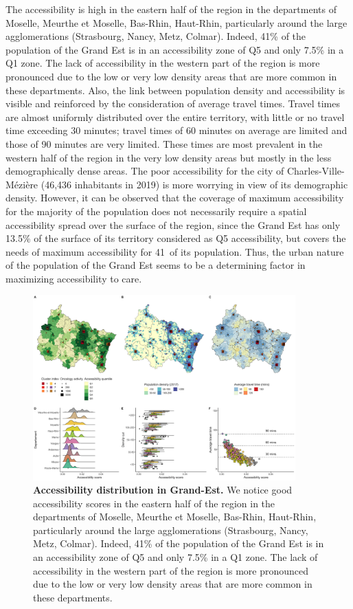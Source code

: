 The accessibility is high in the eastern half of the region in the departments
of Moselle, Meurthe et Moselle, Bas-Rhin, Haut-Rhin, particularly around the
large agglomerations (Strasbourg, Nancy, Metz, Colmar). Indeed, 41\% of the
population of the Grand Est is in an accessibility zone of Q5 and only 7.5\% in
a Q1 zone. The lack of accessibility in the western part of the region is more
pronounced due to the low or very low density areas that are more common in
these departments. Also, the link between population density and accessibility
is visible and reinforced by the consideration of average travel times. Travel
times are almost uniformly distributed over the entire territory, with little or
no travel time exceeding 30 minutes; travel times of 60 minutes on average are
limited and those of 90 minutes are very limited. These times are most prevalent
in the western half of the region in the very low density areas but mostly in
the less demographically dense areas.  The poor accessibility for the city of
Charles-Ville-Mézière (46,436 inhabitants in 2019) is more worrying in view of
its demographic density. However, it can be observed that the coverage of
maximum accessibility for the majority of the population does not necessarily
require a spatial accessibility spread over the surface of the region, since the
Grand Est has only 13.5\% of the surface of its territory considered as Q5
accessibility, but covers the needs of maximum accessibility for 41\ of its
population. Thus, the urban nature of the population of the Grand Est seems to
be a determining factor in maximizing accessibility to care.

\begin{figure}[H]
    \includegraphics[width=0.9\textwidth]{images/camion/region_accessibility/accessibility_Grand-Est.png}
    \centering
    \caption{ \textbf{Accessibility distribution in Grand-Est.} We notice good
        accessibility scores in the eastern half of the region in the
        departments of Moselle, Meurthe et Moselle, Bas-Rhin, Haut-Rhin,
        particularly around the large agglomerations (Strasbourg, Nancy, Metz,
        Colmar). Indeed, 41\% of the population of the Grand Est is in an
        accessibility zone of Q5 and only 7.5\% in a Q1 zone. The lack of
        accessibility in the western part of the region is more pronounced due
        to the low or very low density areas that are more common in these
        departments. }
\end{figure}

